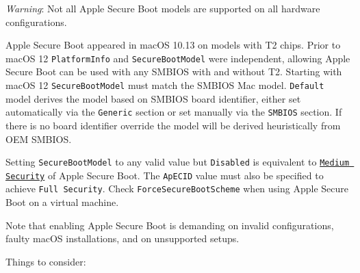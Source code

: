 \documentclass[]{article}
\begin{document}
\begin{enumerate}
  \emph{Warning}: Not all Apple Secure Boot models are supported on all hardware configurations.

  Apple Secure Boot appeared in macOS 10.13 on models with T2 chips.
  Prior to macOS 12 \texttt{PlatformInfo} and \texttt{SecureBootModel} were independent,
  allowing Apple Secure Boot can be used with any SMBIOS with and without T2.
  Starting with macOS 12 \texttt{SecureBootModel} must match the SMBIOS Mac model.
  \texttt{Default} model derives the model based on SMBIOS board identifier, either
  set automatically via the \texttt{Generic} section or set manually via the \texttt{SMBIOS} section.
  If there is no board identifier override the model will be derived heuristically from OEM SMBIOS.

  Setting \texttt{SecureBootModel} to any valid value but \texttt{Disabled}
  is equivalent to
  \href{https://support.apple.com/en-us/HT208330}{\texttt{Medium Security}}
  of Apple Secure Boot. The \texttt{ApECID} value must also be specified to
  achieve \texttt{Full Security}. Check \texttt{ForceSecureBootScheme}
  when using Apple Secure Boot on a virtual machine.

  Note that enabling Apple Secure Boot is demanding on invalid configurations,
  faulty macOS installations, and on unsupported setups.

  Things to consider:


\end{enumerate}
\end{document}
